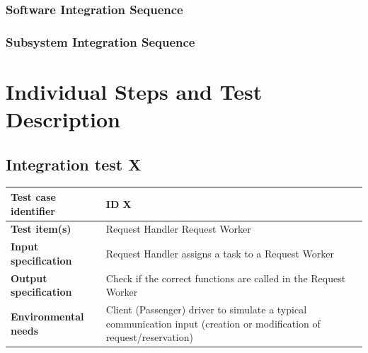 \documentclass[a4paper,11pt]{report} %
\begin{document}
	\subsubsection{Software Integration Sequence}
	\subsubsection{Subsystem Integration Sequence}
	
	
	\section{Individual Steps and Test Description}
		\subsection{Integration test X}
		\begin{minipage}{\linewidth}
		\end{minipage}
		\begin{center}
				\renewcommand{\arraystretch}{1.2}
				\setlength{\tabcolsep}{24pt}
			\begin{tabular}{ l  p{9cm}}\hline
				\textbf{Test case identifier} & ID X\\\hline
				\textbf{Test item(s)} & Request Handler \textrightarrow Request Worker\\\hline
				\textbf{Input specification} & Request Handler assigns a task to a Request Worker \\\hline
				\textbf{Output specification} & Check if the correct functions are called in the Request Worker\\\hline
				\textbf{Environmental needs} & Client (Passenger) driver to simulate a typical communication input (creation or modification of request/reservation)\\\hline
			\end{tabular}
		\end{center}	
\end{document}
